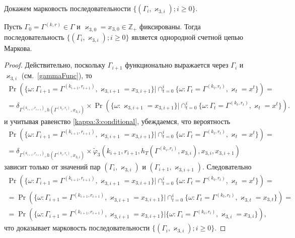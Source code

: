\documentclass[a4paper,12pt,russian]{extarticle}
\newcommand{\ga}[1]{\Gamma^{\left( #1 \right)} }
\newcommand{\MarkThree}{\{(\Gamma_i, \varkappa_{3,i}); i \geqslant 0\}}
\newcommand{\mll}[1]{\begin{multline*}#1\end{multline*}}
\begin{document}
Докажем марковость последовательности $\MarkThree$.
\begin{theorem}
Пусть $\Gamma_0=\ga{k,r}\in \Gamma$ и $\varkappa_{3,0}=x_{3,0}\in \mathbb{Z}_+$ фиксированы. Тогда последовательность $\MarkThree$ является однородной счетной цепью Маркова.
\end{theorem}
\begin{proof}
Действительно, поскольку $\Gamma_{i+1}$ функционально выражается через $\Gamma_i$ и $\varkappa_{3,i}$ (см.~\eqref{gammaFunc}), то
\mll
{
\Pr (\{ \omega \colon \Gamma_{i+1} =\ga{k_{i+1},r_{i+1}},\varkappa_{3,i+1} = x_{3,i+1}\} |\cap_{t=0}^{i}\{\omega\colon \Gamma_t=\ga{k_t,r_t}, \varkappa_t=x^t\})=\\
=\delta_{\ga{k_{i+1},r_{i+1}},h(\ga{k_i,r_i},x_{3,i})}\times \Pr (\{ \omega \colon \varkappa_{3,i+1} = x_{3,i+1}\} |\cap_{t=0}^{i}\{\omega\colon \Gamma_t=\ga{k_t,r_t}, \varkappa_t=x^t\}).
}
и учитывая равенство \eqref{kappa:3:conditional}, убеждаемся, что вероятность 
\mll
{
\Pr (\{ \omega \colon \Gamma_{i+1} =\ga{k_{i+1},r_{i+1}},\varkappa_{3,i+1} = x_{3,i+1}\} |\cap_{t=0}^{i}\{\omega\colon \Gamma_t=\ga{k_t,r_t}, \varkappa_t=x^t\}) = \\
=\delta_{\ga{k_{i+1},r_{i+1}},h(\ga{k_i,r_i},x_{3,i})} \times \widetilde{\varphi}_3(k_{i+1},r_{i+1},h_T(\ga{k_i,r_i},x_{3,i}),x_{3,i},x_{3,i+1})
}
зависит только от значений пар $(\Gamma_i,\varkappa_{3,i})$ и $(\Gamma_{i+1},\varkappa_{3,i+1})$. Следовательно 
\mll
{
\Pr (\{ \omega \colon \Gamma_{i+1} =\ga{k_{i+1},r_{i+1}},\varkappa_{3,i+1} = x_{3,i+1}\} |\cap_{t=0}^{i}\{\omega\colon \Gamma_t=\ga{k_t,r_t}, \varkappa_t=x^t\})=\\
=\Pr (\{ \omega \colon \Gamma_{i+1} =\ga{k_{i+1},r_{i+1}},\varkappa_{3,i+1} = x_{3,i+1}\} |\cap_{t=0}^{i}\{\omega\colon \Gamma_t=\ga{k_t,r_t}, \varkappa_{3,t}=x_{3,t}\})=\\
=\Pr (\{ \omega \colon \Gamma_{i+1} =\ga{k_{i+1},r_{i+1}},\varkappa_{3,i+1} = x_{3,i+1}\} |\{\omega\colon \Gamma_i=\ga{k_i,r_i}, \varkappa_{3,i}=x_{3,i}\}),
}
что доказывает марковость последовательности $\MarkThree$.
\end{proof}
\end{document}
